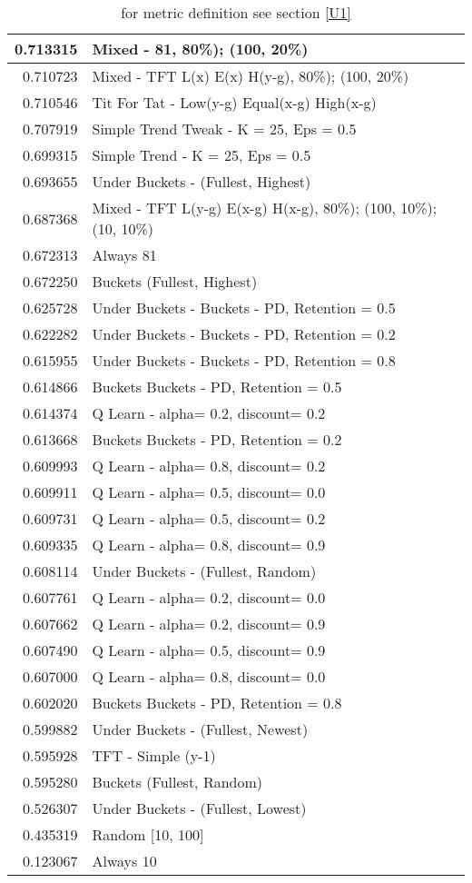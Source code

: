 \begin{table}[!hbtp]
\begin{footnotesize}
\begin{tabular}{|r|l|}
0.713315 & Mixed - {81, 80\%); (100, 20\%)}\\ \hline
0.710723 & Mixed - {TFT L(x) E(x) H(y-g), 80\%); (100, 20\%)}\\ \hline
0.710546 & Tit For Tat - Low(y-g) Equal(x-g) High(x-g)\\ \hline
0.707919 & Simple Trend Tweak - K = 25, Eps = 0.5\\ \hline
0.699315 & Simple Trend - K = 25, Eps = 0.5\\ \hline
0.693655 & Under Buckets - (Fullest, Highest)\\ \hline
0.687368 & Mixed - {TFT L(y-g) E(x-g) H(x-g), 80\%); (100, 10\%); (10, 10\%)}\\ \hline
0.672313 & Always 81\\ \hline
0.672250 & Buckets (Fullest, Highest)\\ \hline
0.625728 & Under Buckets - Buckets - PD, Retention = 0.5\\ \hline
0.622282 & Under Buckets - Buckets - PD, Retention = 0.2\\ \hline
0.615955 & Under Buckets - Buckets - PD, Retention = 0.8\\ \hline
0.614866 & Buckets Buckets - PD, Retention = 0.5\\ \hline
0.614374 & Q Learn - alpha= 0.2, discount= 0.2\\ \hline
0.613668 & Buckets Buckets - PD, Retention = 0.2\\ \hline
0.609993 & Q Learn - alpha= 0.8, discount= 0.2\\ \hline
0.609911 & Q Learn - alpha= 0.5, discount= 0.0\\ \hline
0.609731 & Q Learn - alpha= 0.5, discount= 0.2\\ \hline
0.609335 & Q Learn - alpha= 0.8, discount= 0.9\\ \hline
0.608114 & Under Buckets - (Fullest, Random)\\ \hline
0.607761 & Q Learn - alpha= 0.2, discount= 0.0\\ \hline
0.607662 & Q Learn - alpha= 0.2, discount= 0.9\\ \hline
0.607490 & Q Learn - alpha= 0.5, discount= 0.9\\ \hline
0.607000 & Q Learn - alpha= 0.8, discount= 0.0\\ \hline
0.602020 & Buckets Buckets - PD, Retention = 0.8\\ \hline
0.599882 & Under Buckets - (Fullest, Newest)\\ \hline
0.595928 & TFT - Simple (y-1)\\ \hline
0.595280 & Buckets (Fullest, Random)\\ \hline
0.526307 & Under Buckets - (Fullest, Lowest)\\ \hline
0.435319 & Random [10, 100]\\ \hline
0.123067 & Always 10\\ \hline
\end{tabular}
\caption{for metric definition see section \eqref{U1}}
\end{footnotesize}
\end{table}


